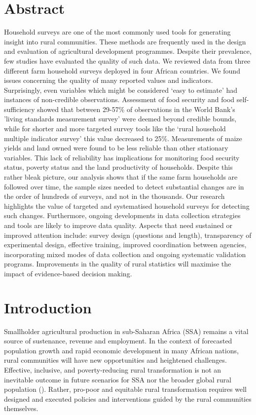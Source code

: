 \section*{Abstract}
Household surveys are one of the most commonly used tools for generating insight into rural communities. These methods are frequently used in the design and evaluation of agricultural development programmes. Despite their prevalence, few studies have evaluated the quality of such data. We reviewed data from three different farm household surveys deployed in four African countries. We found issues concerning the quality of many reported values and indicators. Surprisingly, even variables which might be considered `easy to estimate' had instances of non-credible observations. Assessment of food security and food self-sufficiency showed that between 29-57\% of observations in the World Bank's 'living standards measurement survey' were deemed beyond credible bounds, while for shorter and more targeted survey tools like the `rural household multiple indicator survey' this value decreased to 25\%. Measurements of maize yields and land owned were found to be less reliable than other stationary variables. This lack of reliability has implications for monitoring food security status, poverty status and the land productivity of households. Despite this rather bleak picture, our analysis shows that if the same farm households are followed over time, the sample sizes needed to detect substantial changes are in the order of hundreds of surveys, and not in the thousands. Our research highlights the value of targeted and systematised household surveys for detecting such changes. Furthermore, ongoing developments in data collection strategies and tools are likely to improve data quality. Aspects that need sustained or improved attention include: survey design (questions and length), transparency of experimental design, effective training, improved coordination between agencies, incorporating mixed modes of data collection and ongoing systematic validation programs. Improvements in the quality of rural statistics will maximise the impact of evidence-based decision making.

\newpage

\section{Introduction}

Smallholder agricultural production in sub-Saharan Africa (SSA) remains a vital source of sustenance, revenue and employment. In the context of forecasted population growth and rapid economic development in many African nations, rural communities will have new opportunities and heightened challenges. Effective, inclusive, and poverty-reducing rural transformation is not an inevitable outcome in future scenarios for SSA nor the broader global rural population (\citealp{IFAD2016}). Rather, pro-poor and equitable rural transformation requires well designed and executed policies and interventions guided by the rural communities themselves.

